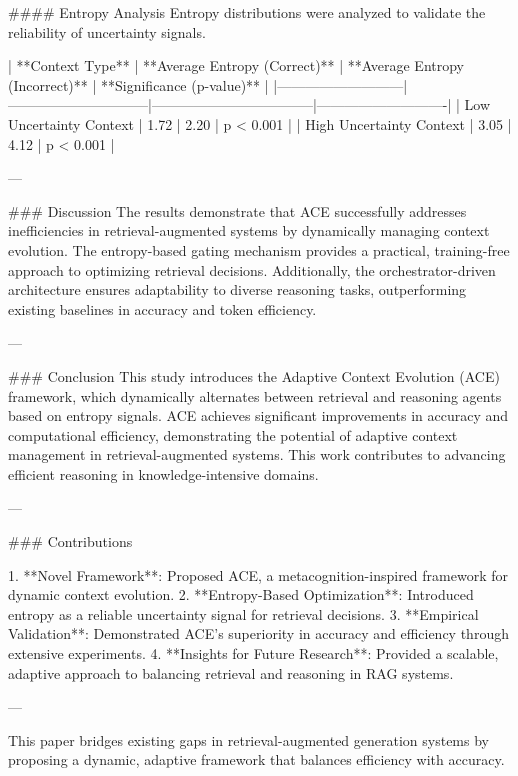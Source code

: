 #### Entropy Analysis  
Entropy distributions were analyzed to validate the reliability of uncertainty signals.  

| **Context Type**          | **Average Entropy (Correct)** | **Average Entropy (Incorrect)** | **Significance (p-value)** |  
|---------------------------|------------------------------|-----------------------------------|----------------------------|  
| Low Uncertainty Context   | 1.72                         | 2.20                             | p < 0.001                  |  
| High Uncertainty Context  | 3.05                         | 4.12                             | p < 0.001                  |  

---

### Discussion  
The results demonstrate that ACE successfully addresses inefficiencies in retrieval-augmented systems by dynamically managing context evolution. The entropy-based gating mechanism provides a practical, training-free approach to optimizing retrieval decisions. Additionally, the orchestrator-driven architecture ensures adaptability to diverse reasoning tasks, outperforming existing baselines in accuracy and token efficiency.

---

### Conclusion  
This study introduces the Adaptive Context Evolution (ACE) framework, which dynamically alternates between retrieval and reasoning agents based on entropy signals. ACE achieves significant improvements in accuracy and computational efficiency, demonstrating the potential of adaptive context management in retrieval-augmented systems. This work contributes to advancing efficient reasoning in knowledge-intensive domains.

---

### Contributions  

1. **Novel Framework**: Proposed ACE, a metacognition-inspired framework for dynamic context evolution.  
2. **Entropy-Based Optimization**: Introduced entropy as a reliable uncertainty signal for retrieval decisions.  
3. **Empirical Validation**: Demonstrated ACE's superiority in accuracy and efficiency through extensive experiments.  
4. **Insights for Future Research**: Provided a scalable, adaptive approach to balancing retrieval and reasoning in RAG systems.  

--- 

This paper bridges existing gaps in retrieval-augmented generation systems by proposing a dynamic, adaptive framework that balances efficiency with accuracy.